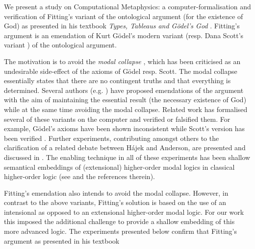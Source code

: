 %
\begin{isabellebody}%
%
%
\isadelimtheory
%
\endisadelimtheory
%
\isatagtheory
%
\endisatagtheory
{\isafoldtheory}%
%
\isadelimtheory
%
\endisadelimtheory
%
\isamarkuptrue%
%
\begin{isamarkuptext}%
We present a study on Computational Metaphysics: a computer-formalisation and verification
of Fitting's variant of the ontological argument (for the existence of God) as presented in
his textbook \emph{Types, Tableaus and G\"odel's God} \cite{Fitting}. Fitting's argument 
is an emendation of Kurt G\"odel's modern variant \cite{GoedelNotes} (resp. Dana Scott's 
variant \cite{ScottNotes}) of the ontological argument.%
\end{isamarkuptext}\isamarkuptrue%
%
\begin{isamarkuptext}%
The motivation is to avoid the \emph{modal collapse} \cite{Sobel,sobel2004logic}, which has been criticised
as an undesirable side-effect of the axioms of G\"odel resp. Scott. The modal collapse essentially  
states that  there are no contingent truths and that everything is determined.
Several authors (e.g. \cite{anderson90:_some_emend_of_goedel_ontol_proof,AndersonGettings,Hajek2002,bjordal99}) 
have proposed emendations of the argument with the aim of maintaining the essential result 
(the necessary existence of God) while at the same time avoiding the modal collapse. 
Related work  has formalised several of these variants on the computer and verified or falsified them. For example,
G\"odel's axioms \cite{GoedelNotes} have been shown inconsistent \cite{C55,C60}
while Scott's version has been verified \cite{ECAI}. Further experiments, contributing amongst others
to the clarification of a related debate between H\'ajek and Anderson, are presented and discussed in
\cite{J23}. The enabling technique in all of these experiments has been
shallow semantical embeddings of (extensional) higher-order modal logics in classical higher-order
logic (see \cite{J23,R59} and the references therein).%
\end{isamarkuptext}\isamarkuptrue%
%
\begin{isamarkuptext}%
Fitting's emendation also intends to avoid the modal collapse. However, in contrast to the above variants, Fitting's
solution is based on the use of an intensional as opposed to an extensional higher-order modal logic.
For our work this imposed the additional challenge to provide a shallow embedding of this more advanced
logic. The experiments presented below confirm that Fitting's argument as presented in his textbook \cite{Fitting}

\end{isamarkuptext}
\end{isabellebody}
